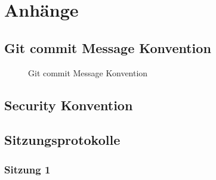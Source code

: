 \chapter{Anhänge}

\section{Git commit Message Konvention}
\label{sec:gitconv}
\begin{figure}[h]
    \centering
    \caption{Git commit Message Konvention}
\end{figure}

\section{Security Konvention}

\section{Sitzungsprotokolle}
\subsection{Sitzung 1}

